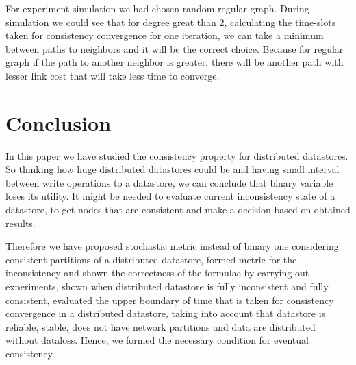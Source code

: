 \documentclass[a4paper,14pt]{llncs}
\begin{document}
%
For experiment simulation we had chosen random regular graph.
During simulation we could see that for degree great than 2, calculating the time-slots taken for consistency convergence for one iteration, we can take a minimum between paths to neighbors and it will be the correct choice. Because for regular graph if the path to another neighbor is greater, there will be another path with lesser link cost that will take less time to converge.
%
\section{Conclusion}
In this paper we have studied the consistency property for distributed datastores.
So thinking how huge distributed datastores could be and having small interval between write operations to a datastore, we can conclude that binary variable loses its utility.
It might be needed to evaluate current inconsistency state of a datastore, to get nodes that are consistent and make a decision based on obtained results.

Therefore we have proposed stochastic metric instead of binary one considering consistent partitions of a distributed datastore, formed metric for the inconsistency and shown the correctness of the formulae by carrying out experiments, shown when distributed datastore is fully inconsistent and fully consistent, evaluated the upper boundary of time that is taken for consistency convergence in a distributed datastore, taking into account that datastore is reliable, stable, does not have network partitions and data are distributed without dataloss. Hence, we formed the necessary condition for eventual consistency.
\end{document}
